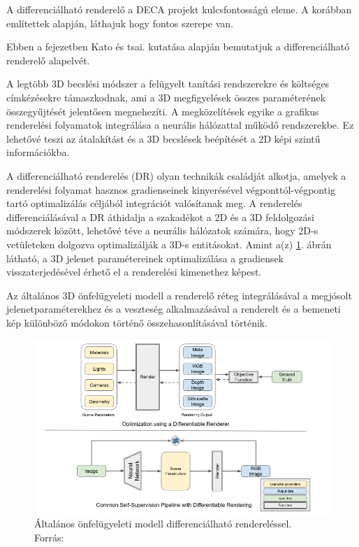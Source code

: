 \documentclass[12pt,a4]{article}
\begin{document}
                A differenciálható renderelő a DECA projekt kulcsfontosságú eleme. A korábban említettek alapján, láthajuk hogy fontos szerepe van.

                 Ebben a fejezetben \cite{diffrenderer}Kato és tsai. kutatása alapján bemutatjuk a differenciálható renderelő alapelvét.

                A legtöbb 3D becslési módszer a felügyelt tanítási rendszerekre és költséges címkézésekre támaszkodnak, ami
                a 3D megfigyelések összes paraméterének összegyűjtését jelentősen megnehezíti. A megközelítések egyike a grafikus renderelési folyamatok integrálása a neurális hálózattal működő rendszerekbe. Ez lehetővé teszi az átalakítást és a 3D becslések beépítését a 2D képi szintű információkba.

                A differenciálható renderelés (DR) olyan technikák családját alkotja, amelyek a renderelési folyamat hasznos gradienseinek kinyerésével végponttól-végpontig tartó optimalizálás céljából integrációt valósítanak meg. A renderelés differenciálásával a DR áthidalja a szakadékot
                a 2D és a 3D feldolgozási módszerek között, lehetővé téve a neurális hálózatok számára, hogy 2D-s vetületeken dolgozva optimalizálják a 3D-s entitásokat. Amint a(z) \ref{fig:diffrenderer}. ábrán látható, a 3D jelenet paramétereinek optimalizálása a gradiensek visszaterjedésével érhető el a renderelési kimenethez képest. 

                Az általános 3D önfelügyeleti modell a renderelő réteg integrálásával a megjósolt jelenetparaméterekhez és a veszteség alkalmazásával a renderelt és a bemeneti kép különböző módokon történő összehasonlításával történik.

                \begin{figure}[h!]	
            		\centering
            		\includegraphics[width=1\linewidth]{diffrenderer}
            		\caption{Általános önfelügyeleti modell differenciálható rendereléssel.\\
                            Forrás: \cite{diffrenderer}}
                    \label{fig:diffrenderer}
            	\end{figure}
\end{document}
